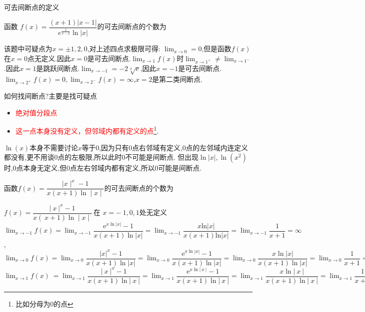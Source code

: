 \documentclass[8pt a4paper, oneside, UTF8]{ctexbook}
\begin{document}
\begin{sloppypar}
\begin{defn}{可去间断点的定义}{}
\begin{center}
        \end{center}
    \end{defn}
    \begin{problem}
        函数 $f\left(x\right)=\dfrac{(x+1)|x-1|}{e^{\frac{1}{x-2}}\ln|x|}$的可去间断点的个数为
    \end{problem}
    \begin{solution}
        该题中可疑点为$x = \pm 1,2,0$,对上述四点求极限可得:
        $\lim_{x\to 0}=0$,但是函数$f(x)$在$x=0$点无定义.因此$x=0$是可去间断点.$\lim_{x\to 1}f(x)$时$\lim_{x\to1^+}\neq \lim_{x\to 1^-}$.因此$x=1$是跳跃间断点.$\lim_{x\to -1}=-2\sqrt[3]{e}$,因此$x=-1$是可去间断点.$\lim_{x\to2^+}f(x)=0,\lim_{x\to2^-}f(x)=\infty$,$x=2$是第二类间断点.
    \end{solution}
    \begin{note}
        如何找间断点?主要是找可疑点
        \begin{itemize}
            \item \textcolor{red}{绝对值分段点}
            \item \textcolor{red}{这一点本身没有定义，但邻域内都有定义的点}\footnote{比如分母为0的点}.
        \end{itemize}
        $\ln(x)$本身不需要讨论$x$等于$0$,因为只有$0$点右邻域有定义,$0$点的左邻域内连定义都没有,更不用谈$0$点的左极限,所以此时$0$不可能是间断点.
        但出现$\ln |x|,\ln(x^2)$时,$0$点本身无定义,但$0$点左右邻域内都有定义,所以$0$可能是间断点.
    \end{note}
    \begin{problem}
        函数$f(x)=\dfrac{\mid x\mid^{x}-1}{x(x+1)\ln\mid x\mid}$的可去间断点的个数为      
    \end{problem}
    \begin{solution}
        $f(x)=\dfrac{\left|\:x\:\right|^{x}-1}{x(\:x+1)\ln\mid x\mid}\:$在 $x=-\:1,0,1$\:处无定义\:\\ 
        $\operatorname*{lim}_{x\to-1}f(x)=\operatorname*{lim}_{x\to-1}\dfrac{\mathrm{e}^{x\ln\left|x\right|}-1}{x(x+1)\ln\left|x\right|}=\operatorname*{lim}_{x\to-1}\dfrac{x\mathrm{ln}\left|x\right|}{x(x+1)\mathrm{ln}\left|x\right|}=\operatorname*{lim}_{x\to-1}\dfrac{1}{x+1}=\infty$, \\
        $\lim_{x\to0}f(x)=\lim_{x\to0}\dfrac{\left|x\right|^{x}-1}{x(x+1)\ln\left|x\right|}=\lim_{x\to0}\dfrac{\mathrm{e}^{x\ln\left|x\right|}-1}{x(x+1)\ln\left|x\right|}=\lim_{x\to0}\dfrac{x\ln\left|x\right|}{x(x+1)\ln\left|x\right|}=\lim_{x\to0}\dfrac{1}{x+1}=1\:, $\\
        $\operatorname*{lim}_{x\to1}f(x)\:=\operatorname*{lim}_{x\to1}{\dfrac{\left|\:x\:\right|^{x}-1}{x(x+1)\ln\left|\:x\:\right|}}=\operatorname*{lim}_{x\to1}{\dfrac{\mathrm{e}^{x\ln\left|\:x\:\right|}-1}{x(x+1)\ln\left|\:x\:\right|}}=\operatorname*{lim}_{x\to1}{\dfrac{x\ln\left|\:x\:\right|}{x(x+1)\ln\left|\:x\:\right|}}=\operatorname*{lim}_{x\to1}{\dfrac{1}{x+1}}={\dfrac{1}{2}}$

\end{solution}
\end{sloppypar}
\end{document}
